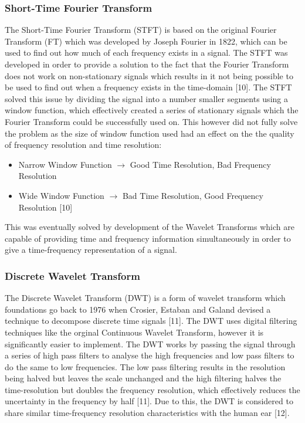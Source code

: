 \documentclass[a4paper, 11pt]{article}
\begin{document}
\subsubsection{Short-Time Fourier Transform}
The Short-Time Fourier Transform (STFT) is based on the original Fourier Transform (FT) which was developed by Joseph Fourier in 1822, which can be used to find out how much of each frequency exists in a signal. The STFT was developed in order to provide a solution to the fact that the Fourier Transform does not work on non-stationary signals which results in it not being possible to be used to find out when a frequency exists in the time-domain [10]. The STFT solved this issue by dividing the signal into a number smaller segments using a window function, which effectively created a series of stationary signals which the Fourier Transform could be successfully used on. This however did not fully solve the problem as the size of window function used had an effect on the the quality of frequency resolution and time resolution:
\begin{itemize}
\item Narrow Window Function $\longrightarrow$  Good Time Resolution, Bad Frequency Resolution
\item Wide Window Function $\longrightarrow$  Bad Time Resolution, Good Frequency Resolution [10]
\end{itemize}

This was eventually solved by development of the Wavelet Transforms which are capable of providing time and frequency information simultaneously in order to give a time-frequency representation of a signal.

\subsubsection{Discrete Wavelet Transform}
The Discrete Wavelet Transform (DWT) is a form of wavelet transform which foundations go back to 1976 when Crosier, Estaban and Galand devised a technique to decompose discrete time signals [11]. The DWT uses digital filtering techniques like the orginal Continuous Wavelet Transform, however it is significantly easier to implement. The DWT works by passing the signal through a series of high pass filters to analyse the high frequencies and low pass filters to do the same to low frequencies. The low pass filtering results in the resolution being halved but leaves the scale unchanged and the high filtering halves the time-resolution but doubles the frequency resolution, which effectively reduces the uncertainty in the frequency by half [11]. Due to this, the DWT is considered to share similar time-frequency resolution characteristics with the human ear [12].
\end{document}
